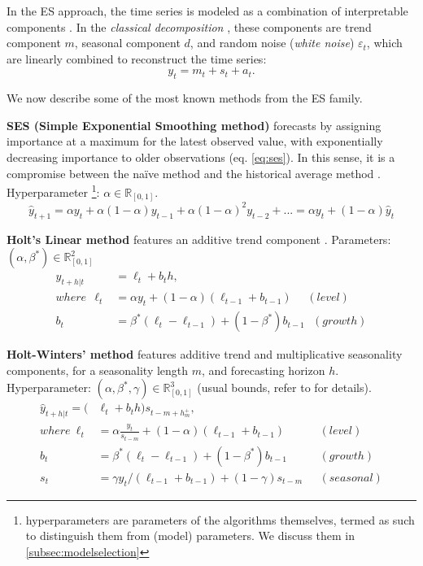 In the ES approach, the time series is modeled as a combination of interpretable components \cite{brockwell1990methods}.
In the \textit{classical decomposition} \cite{makridakis1997arma}, these components are trend component $m$, seasonal component $d$, and random noise (\textit{white noise}) $\varepsilon_t$, which are linearly combined to reconstruct the time series:
\begin{equation}\label{eq:ts_classical_decomp}
    y_t = m_t + s_t + a_t .
\end{equation}

We now describe some of the most known methods from the ES family.

\noindent
\textbf{SES (Simple Exponential Smoothing method)} forecasts by assigning importance at a maximum for the latest observed value, with exponentially decreasing importance to older observations (eq. \ref{eq:ses}).
In this sense, it is a compromise between the naïve method and the historical average method \cite{hyndman2018principles}.
Hyperparameter \footnote[1]{hyperparameters are parameters of the algorithms themselves, termed as such to distinguish them from (model) parameters. We discuss them in \ref{subsec:modelselection}}: $\alpha \in \mathbb{R}_{[0,1]}$.
\begin{equation}\label{eq:ses}
    \hat{y}_{t+1} = \alpha y_{t} + \alpha (1-\alpha) y_{t-1} + \alpha (1-\alpha)^2 y_{t-2} + ... = \alpha y_{t} + (1-\alpha) \hat{y}_{t}
\end{equation}

\noindent
\textbf{Holt's Linear method} features an additive trend component \cite{hyndman2008es}. Parameters: $(\alpha, \beta^*) \in \mathbb{R}^2_{[0,1]}$
\begin{equation}\label{eq:holt_linear}
    \begin{aligned}
    \hat{y}_{t+h|t} &= \ell_t + b_th, \\
    where\ \  \ell_t &= \alpha y_t + (1-\alpha)(\ell_{t-1}+b_{t-1}) \ \ \ \ \ \ (level) \\
    b_t &= \beta^*(\ell_t - \ell_{t-1}) + (1-\beta^*)b_{t-1} \ \ \ (growth)
    \end{aligned}
\end{equation}

\newpage
\noindent
\textbf{Holt-Winters' method} features additive trend and multiplicative seasonality components, for a seasonality length $m$, and forecasting horizon $h$.
Hyperparameter: $(\alpha, \beta^*,\gamma) \in \mathbb{R}^3_{[0,1]}$ (usual bounds, refer to \cite{hyndman2008es} for details).
\begin{equation}\label{eq:hs_method}
    \begin{aligned}
    \hat{y}_{t+h|t} = (&\ell_t + b_th)s_{t-m+h^+_m}, \\
    where \ \ell_t &= \alpha \frac{y_t}{s_{t-m}} + (1-\alpha)(\ell_{t-1}+b_{t-1})   &(level) \\
    b_t &= \beta^*(\ell_t - \ell_{t-1}) + (1-\beta^*)b_{t-1} &(growth) \\
    s_t &= \gamma y_t/(\ell_{t-1}+b_{t-1}) + (1-\gamma)s_{t-m} \ \ \ &(seasonal)
    \end{aligned}
\end{equation}

